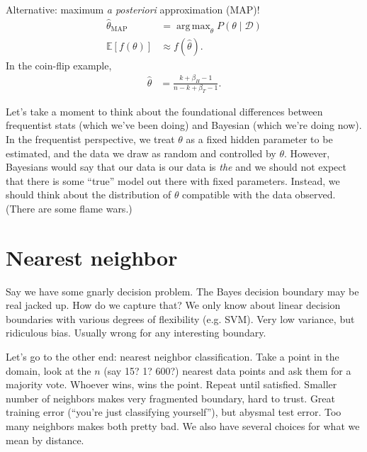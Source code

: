 \documentclass[11pt,letterpaper]{article}
\DeclareMathOperator*{\argmax}{arg\,max}
\theoremstyle{definition}
\theoremstyle{plain}
\numberwithin{equation}{section}
\numberwithin{figure}{section}
\begin{document}
Alternative: maximum \emph{a posteriori} approximation (MAP)!
%
\begin{align}
	\hat{\theta}_{\mathrm{MAP}} &= \argmax_\theta P(\theta \mid \mathcal{D})\\
	\mathbb{E}[f(\theta)] &\approx f(\hat{\theta}).
\end{align}
%
In the coin-flip example,
%
\begin{align}
	\hat{\theta} &= \frac{k + \beta_H - 1}{n - k + \beta_T - 1}.
\end{align}




Let's take a moment to think about the foundational differences between frequentist stats (which we've been doing) and Bayesian (which we're doing now). In the frequentist perspective, we treat $\theta$ as a fixed hidden parameter to be estimated, and the data we draw as random and controlled by $\theta$. However, Bayesians would say that our data is our data is \emph{the} and we should not expect that there is some ``true'' model out there with fixed parameters. Instead, we should think about the distribution of $\theta$ compatible with the data observed. (There are some flame wars.)
























\section{Nearest neighbor}
Say we have some gnarly decision problem. The Bayes decision boundary may be real jacked up. How do we capture that? We only know about linear decision boundaries with various degrees of flexibility (e.g. SVM). Very low variance, but ridiculous bias. Usually wrong for any interesting boundary.

Let's go to the other end: nearest neighbor classification. Take a point in the domain, look at the $n$ (say 15? 1? 600?) nearest data points and ask them for a majority vote. Whoever wins, wins the point. Repeat until satisfied. Smaller number of neighbors makes very fragmented boundary, hard to trust. Great training error (``you're just classifying yourself''), but abysmal test error. Too many neighbors makes both pretty bad. We also have several choices for what we mean by distance.
\end{document}
